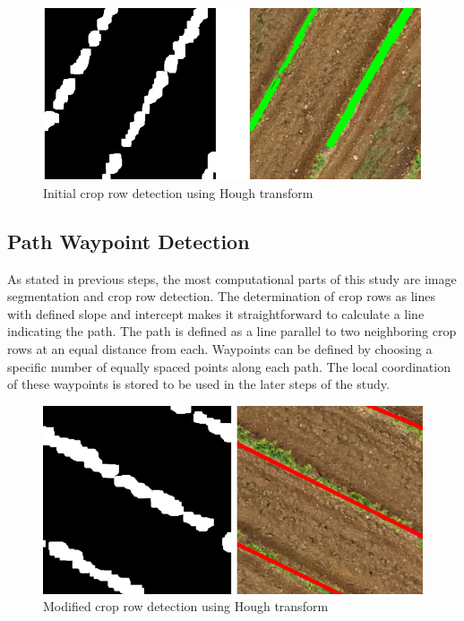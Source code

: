 \documentclass[conference]{IEEEtran}
\begin{document}
\begin{figure}[htbp]
\includegraphics[width=\linewidth]{Hough initial2.png}
\caption{Initial crop row detection using Hough transform}
\label{fig3}
\end{figure}

\subsection{Path Waypoint Detection}\label{Path Waypoint Detection}
As stated in previous steps, the most computational parts of this study are image segmentation and crop row detection. The determination of crop rows as lines with defined slope and intercept makes it straightforward to calculate a line indicating the path. The path is defined as a line parallel to two neighboring crop rows at an equal distance from each. 
Waypoints can be defined by choosing a specific number of equally spaced points along each path. The local coordination of these waypoints is stored to be used in the later steps of the study. 



\begin{figure}[htbp]
\includegraphics[width=\linewidth]{Hough Revised2.png}
\caption{Modified crop row detection using Hough transform}
\label{fig4}
\end{figure}
\end{document}
